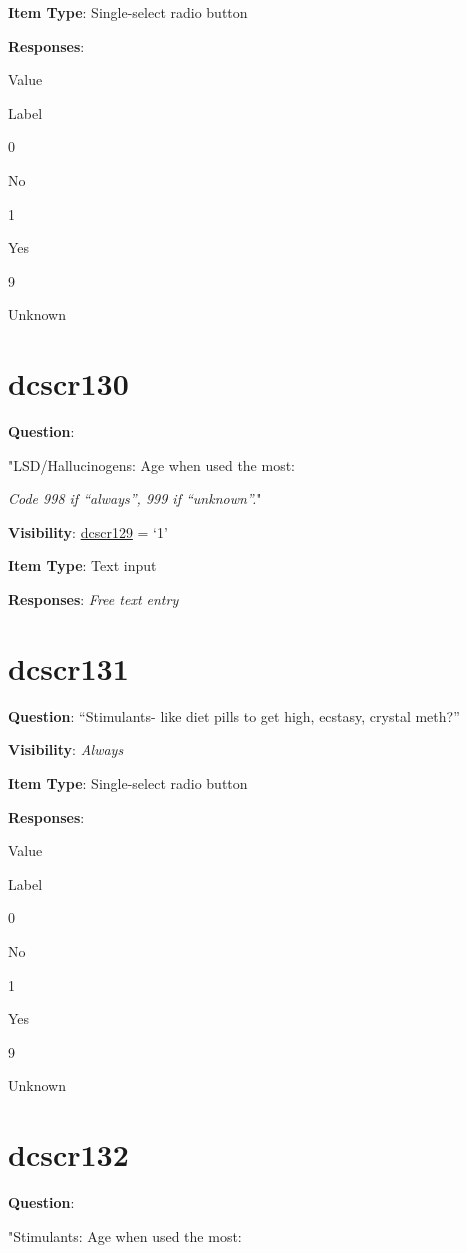 \documentclass[]{book}
\begin{document}
\textbf{Item Type}: Single-select radio button

\textbf{Responses}:

Value

Label

0

No

1

Yes

9

Unknown

\hypertarget{dcscr130}{%
\section{dcscr130}\label{dcscr130}}

\textbf{Question}:

"LSD/Hallucinogens: Age when used the most:

\emph{Code 998 if ``always'', 999 if ``unknown''.}"

\textbf{Visibility}: \protect\hyperlink{dcscr129}{dcscr129} = `1'

\textbf{Item Type}: Text input

\textbf{Responses}: \emph{Free text entry}

\hypertarget{dcscr131}{%
\section{dcscr131}\label{dcscr131}}

\textbf{Question}: ``Stimulants- like diet pills to get high, ecstasy, crystal meth?''

\textbf{Visibility}: \emph{Always}

\textbf{Item Type}: Single-select radio button

\textbf{Responses}:

Value

Label

0

No

1

Yes

9

Unknown

\hypertarget{dcscr132}{%
\section{dcscr132}\label{dcscr132}}

\textbf{Question}:

"Stimulants: Age when used the most:
\end{document}
